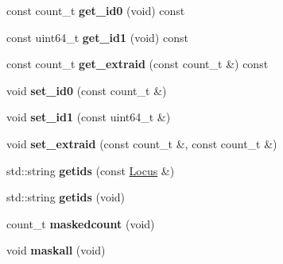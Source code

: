 \begin{DoxyCompactItemize}
\item 
\hypertarget{classprofile_a03d515acfae4c9fc075f720589f7c964}{const count\-\_\-t {\bfseries get\-\_\-id0} (void) const }\label{classprofile_a03d515acfae4c9fc075f720589f7c964}

\item 
\hypertarget{classprofile_a57f1bae9b8d98c7e28724d7d23c4c612}{const uint64\-\_\-t {\bfseries get\-\_\-id1} (void) const }\label{classprofile_a57f1bae9b8d98c7e28724d7d23c4c612}

\item 
\hypertarget{classprofile_a46009d92f63c0d5d36d7af9a5b40bb97}{const count\-\_\-t {\bfseries get\-\_\-extraid} (const count\-\_\-t \&) const }\label{classprofile_a46009d92f63c0d5d36d7af9a5b40bb97}

\item 
\hypertarget{classprofile_a25ea4b0119e1382e9bc8254907c51ec5}{void {\bfseries set\-\_\-id0} (const count\-\_\-t \&)}\label{classprofile_a25ea4b0119e1382e9bc8254907c51ec5}

\item 
\hypertarget{classprofile_a6dd6fc73da5f2fe92ab296cb285aec36}{void {\bfseries set\-\_\-id1} (const uint64\-\_\-t \&)}\label{classprofile_a6dd6fc73da5f2fe92ab296cb285aec36}

\item 
\hypertarget{classprofile_a294c2910cd050af04b59be4cbad147f4}{void {\bfseries set\-\_\-extraid} (const count\-\_\-t \&, const count\-\_\-t \&)}\label{classprofile_a294c2910cd050af04b59be4cbad147f4}

\item 
\hypertarget{classprofile_aff532ee9a518c260d97887bb2d871919}{std\-::string {\bfseries getids} (const \hyperlink{classLocus}{Locus} \&)}\label{classprofile_aff532ee9a518c260d97887bb2d871919}

\item 
\hypertarget{classprofile_a4f382064cda45a1df2a18a86da9aaf76}{std\-::string {\bfseries getids} (void)}\label{classprofile_a4f382064cda45a1df2a18a86da9aaf76}

\item 
\hypertarget{classprofile_af1587eb40e7e3c670d08324c5d95f7c3}{count\-\_\-t {\bfseries maskedcount} (void)}\label{classprofile_af1587eb40e7e3c670d08324c5d95f7c3}

\item 
\hypertarget{classprofile_a7750f121c26754638453f2d7cd6782d4}{void {\bfseries maskall} (void)}\label{classprofile_a7750f121c26754638453f2d7cd6782d4}


\end{DoxyCompactItemize}
